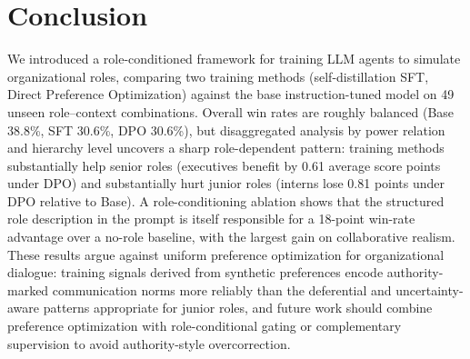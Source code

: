 \documentclass{article}
\begin{document}
\section{Conclusion}

We introduced a role-conditioned framework for training LLM agents to simulate organizational roles, comparing two training methods (self-distillation SFT, Direct Preference Optimization) against the base instruction-tuned model on 49 unseen role--context combinations. Overall win rates are roughly balanced (Base 38.8\%, SFT 30.6\%, DPO 30.6\%), but disaggregated analysis by power relation and hierarchy level uncovers a sharp role-dependent pattern: training methods substantially help senior roles (executives benefit by 0.61 average score points under DPO) and substantially hurt junior roles (interns lose 0.81 points under DPO relative to Base). A role-conditioning ablation shows that the structured role description in the prompt is itself responsible for a 18-point win-rate advantage over a no-role baseline, with the largest gain on collaborative realism. These results argue against uniform preference optimization for organizational dialogue: training signals derived from synthetic preferences encode authority-marked communication norms more reliably than the deferential and uncertainty-aware patterns appropriate for junior roles, and future work should combine preference optimization with role-conditional gating or complementary supervision to avoid authority-style overcorrection.




\end{document}

